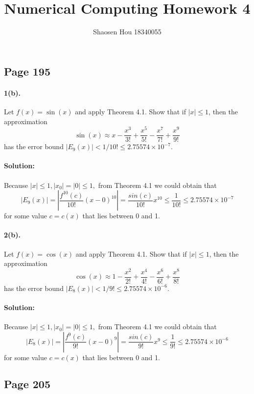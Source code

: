 \documentclass{article}  %
\title{Numerical Computing Homework 4}
\author{Shaosen Hou 18340055}
\begin{document}
    \maketitle
        \subsection*{Page 195} 
        \paragraph{1(b).}Let $f(x) = \sin(x)$ and apply Theorem 4.1. Show that if $|x| \le 1$, then the approximation 
        $$\sin(x) \approx x - \frac{x^3}{3!} + \frac{x^5}{5!} - \frac{x^7}{7!} + \frac{x^9}{9!}$$
        has the error bound $|E_9(x)| < 1/10! \le 2.75574 \times 10^{-7}.$
        \paragraph{Solution:}
        \paragraph{}Because $|x| \le 1, |x_0| = |0| \le 1,$ from Theorem 4.1 we could obtain that
        $$|E_9(x)| = |\frac{f^{10}(c)}{10!}(x - 0)^{10}| = \frac{sin(c)}{10!}x^{10} \le \frac{1}{10!} \le 2.75574 \times 10^{-7}$$
        for some value $c = c(x)$ that lies between 0 and 1.
        \paragraph{2(b).}Let $f(x) = \cos(x)$ and apply Theorem 4.1. Show that if $|x| \le 1$, then the approximation 
        $$\cos(x) \approx 1 - \frac{x^2}{2!} + \frac{x^4}{4!} - \frac{x^6}{6!} + \frac{x^8}{8!}$$
        has the error bound $|E_8(x)| < 1/9! \le 2.75574 \times 10^{-6}.$
        \paragraph{Solution:}
        \paragraph{}Because $|x| \le 1, |x_0| = |0| \le 1,$ from Theorem 4.1 we could obtain that
        $$|E_8(x)| = |\frac{f^{9}(c)}{9!}(x - 0)^{9}| = \frac{sin(c)}{9!}x^{9} \le \frac{1}{9!} \le 2.75574 \times 10^{-6}$$
        for some value $c = c(x)$ that lies between 0 and 1.
        \subsection*{Page 205}
\end{document}
